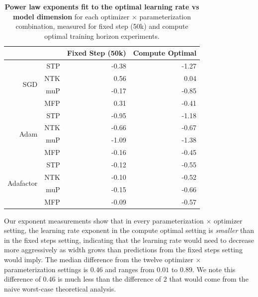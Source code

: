 \begin{table}[htbp]
  \centering
  \caption{\textbf{Power law exponents fit to the optimal learning rate vs model dimension} for each optimizer $\times$ parameterization combination, measured for fixed step (50k) and compute optimal training horizon experiments.}
  \vspace{2pt}
  \begin{adjustbox}{scale=0.8}
    \begin{tabular}{rrrr}
        \toprule
            &           & \textbf{Fixed Step (50k)}           & \textbf{Compute Optimal}  \\
         \midrule
          \multirow{4}{*}{SGD} & STP        & -0.38         & -1.27  \\
          & NTK                             & 0.56          & 0.04   \\
          & muP                             & -0.17         & -0.85  \\
          & MFP	                            & 0.31          & -0.41  \\  \midrule
          \multirow{4}{*}{Adam} & STP       & -0.95         & -1.18  \\
          & NTK	                            & -0.66	        & -0.67  \\
          & muP	                            & -1.09         & -1.38  \\
          & MFP	                            & -0.16         & -0.45  \\ \midrule
          \multirow{4}{*}{Adafactor} & STP  & -0.12         & -0.55  \\
          & NTK                             & -0.10         & -0.52  \\
          & muP                             & -0.15         & -0.66  \\
          & MFP                             & -0.09         & -0.57 \\
        \bottomrule
    \end{tabular}
    \end{adjustbox}
  \label{tab:compute_opt_exponents}
\end{table}

Our exponent measurements show that in every parameterization $\times$ optimizer setting, the learning rate exponent in the compute optimal setting is \emph{smaller} than in the fixed steps setting, indicating that the learning rate would need to decrease more aggressively as width grows than predictions from the fixed steps setting would imply. The median difference from the twelve optimizer $\times$ parameterization settings is $0.46$ and ranges from $0.01$ to $0.89$. We note this difference of $0.46$ is much less than the difference of $2$ that would come from the naive worst-case theoretical analysis.

